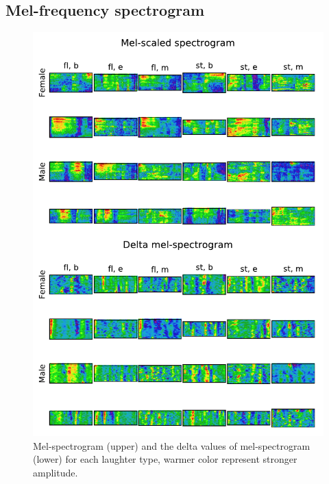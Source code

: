 \documentclass[10pt,journal,compsoc]{IEEEtran}
\begin{document}
\subsection{Mel-frequency spectrogram}
\begin{figure}[!t]
\centering
\includegraphics[width=1\linewidth]{figures/mel_spec.pdf}
\caption{Mel-spectrogram (upper) and the delta values of mel-spectrogram (lower) for each laughter type, warmer color represent stronger amplitude.}
\label{fig:mel_samples}
\end{figure}
\end{document}
